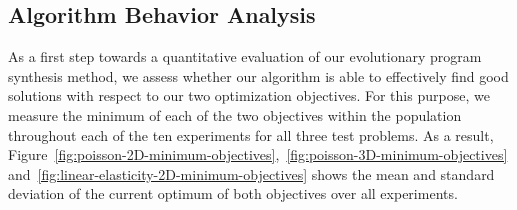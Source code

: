 \subsection{Algorithm Behavior Analysis}
\label{sec:experiments1-algorithm-behavior-analysis}
As a first step towards a quantitative evaluation of our evolutionary program synthesis method, we assess whether our algorithm is able to effectively find good solutions with respect to our two optimization objectives.
For this purpose, we measure the minimum of each of the two objectives within the population throughout each of the ten experiments for all three test problems.
As a result, Figure~\ref{fig:poisson-2D-minimum-objectives},~\ref{fig:poisson-3D-minimum-objectives} and~\ref{fig:linear-elasticity-2D-minimum-objectives} shows the mean and standard deviation of the current optimum of both objectives over all experiments.

